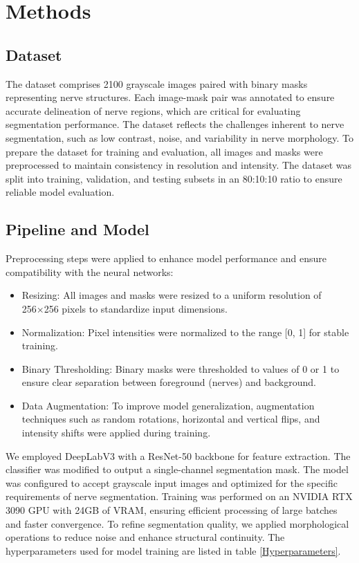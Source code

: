 \documentclass{article}
\begin{document}
\section{Methods}
\subsection{Dataset}
The dataset comprises 2100 grayscale images paired with binary masks representing nerve structures. Each image-mask pair was annotated to ensure accurate delineation of nerve regions, which are critical for evaluating segmentation performance. The dataset reflects the challenges inherent to nerve segmentation, such as low contrast, noise, and variability in nerve morphology. To prepare the dataset for training and evaluation, all images and masks were preprocessed to maintain consistency in resolution and intensity. The dataset was split into training, validation, and testing subsets in an 80:10:10 ratio to ensure reliable model evaluation. 
\subsection{Pipeline and Model}
Preprocessing steps were applied to enhance model performance and ensure compatibility with the neural networks:
\begin{itemize}
    \item Resizing: All images and masks were resized to a uniform resolution of 256×256 pixels to standardize input dimensions.
    \item Normalization: Pixel intensities were normalized to the range [0, 1] for stable training.
    \item Binary Thresholding: Binary masks were thresholded to values of 0 or 1 to ensure clear separation between foreground (nerves) and background.
    \item Data Augmentation: To improve model generalization, augmentation techniques such 
as random rotations, horizontal and vertical flips, 
and intensity shifts were applied during training.
\end{itemize}
We employed DeepLabV3 with a ResNet-50 backbone for feature extraction. The classifier was modified to output a single-channel segmentation mask. The model was configured to accept grayscale input images and optimized for the specific requirements of nerve segmentation. Training was performed on an NVIDIA RTX 3090 GPU with 24GB of VRAM, ensuring efficient processing of large batches and faster convergence. To refine segmentation quality, we applied morphological operations to reduce noise and enhance structural continuity. The hyperparameters used for model training are listed in table \ref{Hyperparameters}. 
\end{document}
